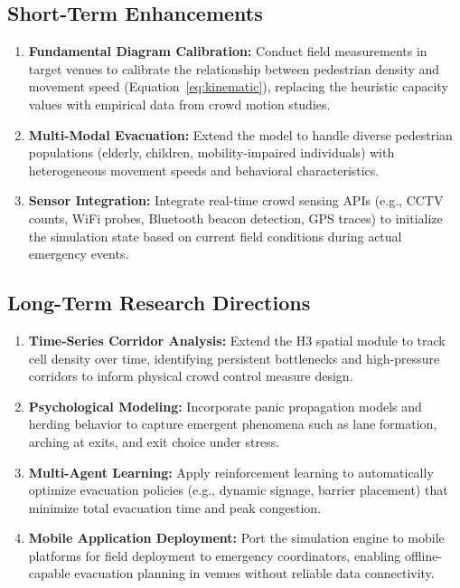 \documentclass[12pt,a4paper,oneside]{report}
\begin{document}
\subsection{Short-Term Enhancements}
\begin{enumerate}
    \item \textbf{Fundamental Diagram Calibration:} Conduct field measurements in target venues to calibrate the relationship between pedestrian density and movement speed (Equation~\ref{eq:kinematic}), replacing the heuristic capacity values with empirical data from crowd motion studies.
    
    \item \textbf{Multi-Modal Evacuation:} Extend the model to handle diverse pedestrian populations (elderly, children, mobility-impaired individuals) with heterogeneous movement speeds and behavioral characteristics.
    
    \item \textbf{Sensor Integration:} Integrate real-time crowd sensing APIs (e.g., CCTV counts, WiFi probes, Bluetooth beacon detection, GPS traces) to initialize the simulation state based on current field conditions during actual emergency events.
\end{enumerate}

\subsection{Long-Term Research Directions}
\begin{enumerate}
    \item \textbf{Time-Series Corridor Analysis:} Extend the H3 spatial module to track cell density over time, identifying persistent bottlenecks and high-pressure corridors to inform physical crowd control measure design.
    
    \item \textbf{Psychological Modeling:} Incorporate panic propagation models and herding behavior to capture emergent phenomena such as lane formation, arching at exits, and exit choice under stress.
    
    \item \textbf{Multi-Agent Learning:} Apply reinforcement learning to automatically optimize evacuation policies (e.g., dynamic signage, barrier placement) that minimize total evacuation time and peak congestion.
    
    \item \textbf{Mobile Application Deployment:} Port the simulation engine to mobile platforms for field deployment to emergency coordinators, enabling offline-capable evacuation planning in venues without reliable data connectivity.
\end{enumerate}
\end{document}
